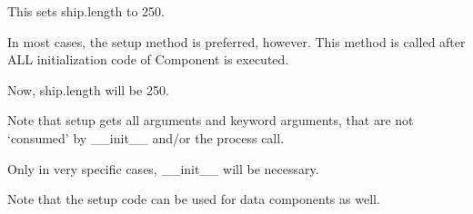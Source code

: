 \documentclass[letterpaper,10pt,english]{sphinxmanual}
\begin{document}
\begin{sphinxVerbatim}[commandchars=\\\{\}]
 
        
          
          

  
\end{sphinxVerbatim}

This sets ship.length to 250.

In most cases, the setup method is preferred, however. This method is called after ALL initialization code
of Component is executed.

\begin{sphinxVerbatim}[commandchars=\\\{\}]
 
      
          

  
\end{sphinxVerbatim}

Now, ship.length will be 250.

Note that setup gets all arguments and keyword arguments, that are not ‘consumed’  by \_\_init\_\_ and/or
the process call.

Only in very specific cases, \_\_init\_\_ will be necessary.

Note that the setup code can be used for data components as well.
\end{document}
